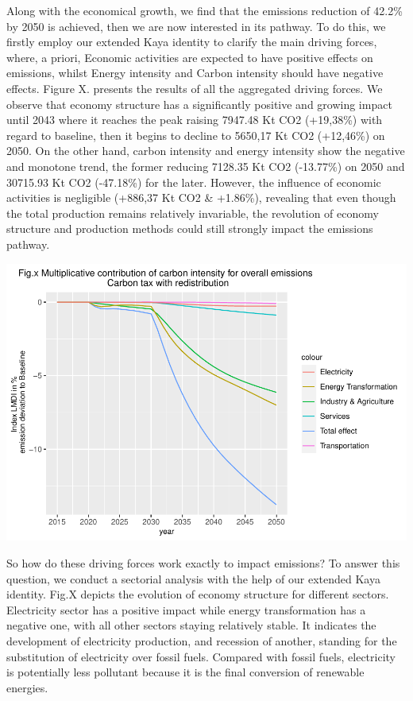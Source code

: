 \documentclass[
]{article}
\begin{document}
Along with the economical growth, we find that the emissions reduction
of 42.2\% by 2050 is achieved, then we are now interested in its
pathway. To do this, we firstly employ our extended Kaya identity to
clarify the main driving forces, where, a priori, Economic activities
are expected to have positive effects on emissions, whilst Energy
intensity and Carbon intensity should have negative effects. Figure X.
presents the results of all the aggregated driving forces. We observe
that economy structure has a significantly positive and growing impact
until 2043 where it reaches the peak raising 7947.48 Kt CO2 (+19,38\%)
with regard to baseline, then it begins to decline to 5650,17 Kt CO2
(+12,46\%) on 2050. On the other hand, carbon intensity and energy
intensity show the negative and monotone trend, the former reducing
7128.35 Kt CO2 (-13.77\%) on 2050 and 30715.93 Kt CO2 (-47.18\%) for the
later. However, the influence of economic activities is negligible
(+886,37 Kt CO2 \& +1.86\%), revealing that even though the total
production remains relatively invariable, the revolution of economy
structure and production methods could still strongly impact the
emissions pathway.

\includegraphics{Modele-ThreeMe-Tunisie_Sequeira_Valilou_Wang_files/figure-latex/unnamed-chunk-21-1.pdf}

So how do these driving forces work exactly to impact emissions? To
answer this question, we conduct a sectorial analysis with the help of
our extended Kaya identity. Fig.X depicts the evolution of economy
structure for different sectors. Electricity sector has a positive
impact while energy transformation has a negative one, with all other
sectors staying relatively stable. It indicates the development of
electricity production, and recession of another, standing for the
substitution of electricity over fossil fuels. Compared with fossil
fuels, electricity is potentially less pollutant because it is the final
conversion of renewable energies.
\end{document}
